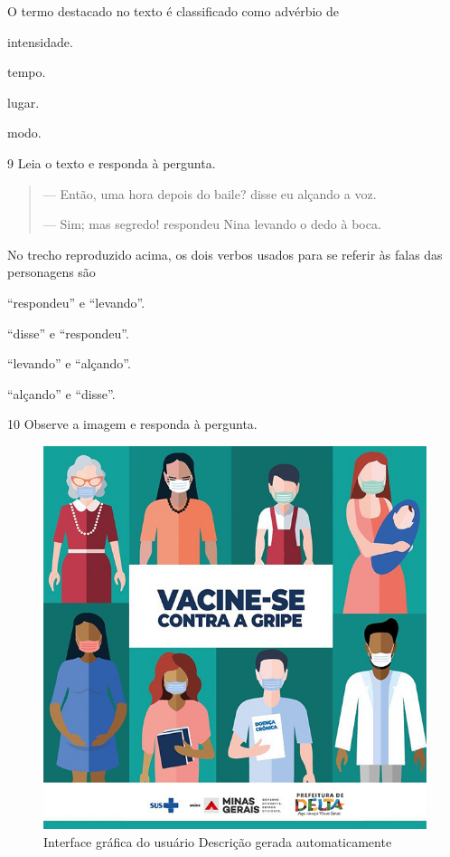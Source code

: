 O termo destacado no texto é classificado como advérbio de

\begin{multicols}{2}
\begin{escolha}
  \item intensidade.

  \item tempo.

  \item lugar.

  \item modo.
\end{escolha}
\end{multicols}


\num{9} Leia o texto e responda à pergunta.

\begin{quote}
--- Então, uma hora depois do baile? disse eu alçando a voz.

--- Sim; mas segredo! respondeu Nina levando o dedo à boca.

\end{quote}

No trecho reproduzido acima, os dois verbos usados para se referir às
falas das personagens são

\begin{escolha}
  \item ``respondeu'' e ``levando''.

  \item ``disse'' e ``respondeu''.

  \item ``levando'' e ``alçando''.

  \item ``alçando'' e ``disse''.
\end{escolha}


\pagebreak
\num{10} Observe a imagem e responda à pergunta.
 
\begin{figure}[htpb!]
\centering
\includegraphics[width=.5\textwidth]{./imgQ4PORT/media/image7.jpeg}
\caption{Interface gráfica do usuário Descrição gerada automaticamente}
\end{figure}

